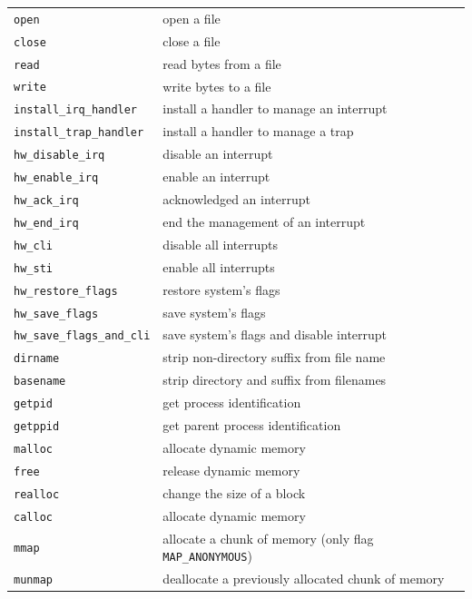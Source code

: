 \documentclass[a4paper,10pt,twoside]{report}
\begin{document}
\begin{longtable}{|l|l|}
\texttt{open} & open a file \\
\texttt{close} & close a file \\
\texttt{read} & read bytes from a file \\
\texttt{write} & write bytes to a file \\ \hline

\texttt{install\_irq\_handler} & install a handler to manage an interrupt \\
\texttt{install\_trap\_handler} & install a handler to manage a trap \\
\texttt{hw\_disable\_irq} & disable an interrupt  \\
\texttt{hw\_enable\_irq} & enable an interrupt \\
\texttt{hw\_ack\_irq} & acknowledged an interrupt \\
\texttt{hw\_end\_irq} & end the management of an interrupt \\
\texttt{hw\_cli} & disable all interrupts \\
\texttt{hw\_sti} & enable all interrupts \\
\texttt{hw\_restore\_flags} & restore system's flags \\
\texttt{hw\_save\_flags} & save system's flags \\
\texttt{hw\_save\_flags\_and\_cli} & save system's flags and disable interrupt \\ \hline

\texttt{dirname} & strip non-directory suffix from file name\\
\texttt{basename} & strip directory and suffix from filenames\\ \hline


\texttt{getpid} & get process identification \\
\texttt{getppid} &get parent process identification \\ \hline

\texttt{malloc} & allocate dynamic memory\\
\texttt{free} & release dynamic memory\\
\texttt{realloc} & change the size of a block\\
\texttt{calloc} & allocate dynamic memory\\ \hline

\texttt{mmap} & allocate a chunk of memory (only flag \texttt{MAP\_ANONYMOUS})\\
\texttt{munmap} &  deallocate a previously allocated chunk of memory \\ \hline


\end{longtable}
\end{document}
